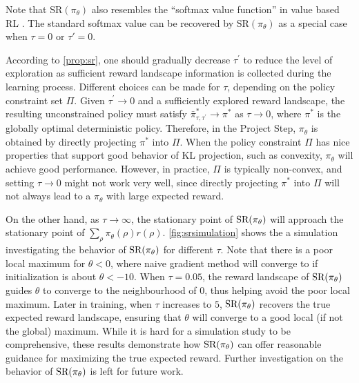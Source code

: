 \begin{remk}
Note that $\text{SR}(\pi_\theta)$ also resembles the 
``softmax value function'' in value based RL
\citep{nachum2017bridging,haarnoja2018soft,ding2017cold}.
The standard softmax value can be recovered by
$\text{SR}(\pi_\theta)$ as a special case when $\tau = 0$ or $\tau'=0$. 
\end{remk}

According to \cref{prop:sr}, one should gradually decrease $\tau^{\prime}$
to reduce the level of exploration as sufficient reward landscape information
is collected during the learning process.
Different choices can be made for $\tau$,
depending on the policy constraint set $\Pi$.
Given $\tau^{\prime} \to 0$ and a sufficiently explored reward landscape,
the resulting unconstrained policy must satisfy
$\bar{\pi}_{\tau,\tau^{\prime}}^* \to \pi^*$ as $\tau \to 0$,
where $\pi^*$ is the globally optimal deterministic policy. 
Therefore, in the Project Step, $\pi_\theta$ is obtained by directly
projecting $\pi^*$ into $\Pi$.
When the policy constraint $\Pi$ has nice properties
that support good behavior of KL projection,
such as convexity,
$\pi_\theta$ will achieve good performance.
However, in practice, $\Pi$ is typically non-convex,
and setting $\tau \to 0$ might not work very well,
since directly projecting $\pi^*$ into $\Pi$ will not always lead to
a $\pi_\theta$ with large expected reward.



On the other hand, as $\tau \to \infty$,
the stationary point of $\text{SR}(\pi_\theta)$ will approach the
stationary point of $\sum_{\rho}{ \pi_\theta(\rho) r(\rho) }$.
\cref{fig:srsimulation} shows the a simulation
investigating the behavior of $\text{SR}(\pi_\theta)$ for different $\tau$.
Note that there is a poor local maximum for $\theta <0$,
where naive gradient method will converge to if initialization is
about $\theta < -10$. 
When $\tau = 0.05$, the reward landscape of $\text{SR}(\pi_\theta)$ guides
$\theta$ to converge to the neighbourhood of $0$,
thus helping avoid the poor local maximum.
Later in training, when $\tau$ increases to $5$,
$\text{SR}(\pi_\theta)$ recovers the true expected reward landscape,
ensuring that $\theta$ will converge to a good local (if not the global)
maximum.
While it is hard for a simulation study to be comprehensive,
these results demonstrate how $\text{SR}(\pi_\theta)$ can offer reasonable guidance
for maximizing the true expected reward.
Further investigation on the behavior of $\text{SR}(\pi_\theta)$
is left for future work.
 
